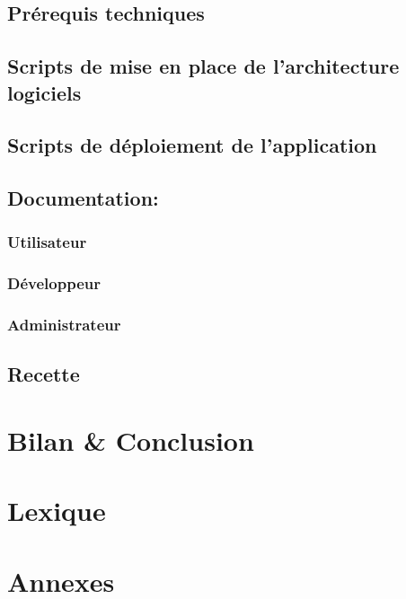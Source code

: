 \documentclass[11pt,a4paper]{report}
\begin{document}
	\section{Prérequis techniques}
	\section{Scripts de mise en place de l'architecture logiciels}
	\section{Scripts de déploiement de l'application}
	\section{Documentation:}
		\subsection{Utilisateur}
		\subsection{Développeur}
		\subsection{Administrateur}
	\section{Recette}

\chapter{Bilan \& Conclusion}

\chapter*{Lexique}

\listoffigures
\listoftables

\chapter*{Annexes}
\end{document}
